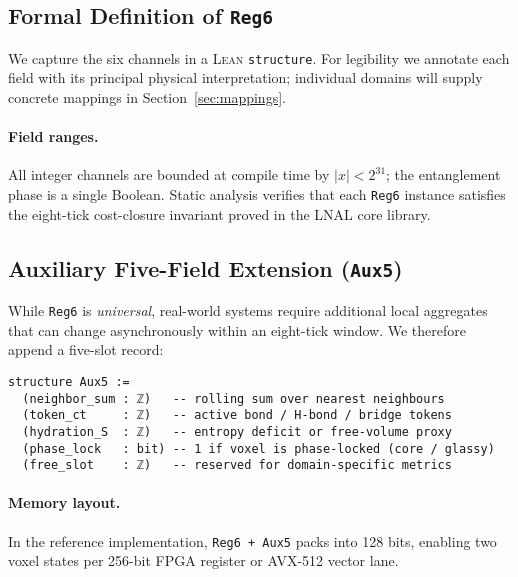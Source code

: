 \documentclass[11pt,a4paper]{article}
\begin{document}
\subsection{Formal Definition of \texttt{Reg6}}
\label{subsec:reg6-definition}

\noindent
We capture the six channels in a \textsc{Lean} \texttt{structure}.
For legibility we annotate each field with its principal physical
interpretation; individual domains will supply concrete mappings in
Section~\ref{sec:mappings}.



\paragraph{Field ranges.}
All integer channels are bounded at compile time by
\mbox{$|x| < 2^{31}$}; the entanglement phase is a single Boolean.
Static analysis verifies that each \texttt{Reg6} instance satisfies the
eight-tick cost-closure invariant proved in the LNAL core library.

\subsection{Auxiliary Five-Field Extension (\texttt{Aux5})}
\label{subsec:aux5-extension}

\noindent
While \texttt{Reg6} is \emph{universal}, real-world systems require
additional local aggregates that can change asynchronously within an
eight-tick window.  We therefore append a five-slot record:

\begin{verbatim}
structure Aux5 :=
  (neighbor_sum : ℤ)   -- rolling sum over nearest neighbours
  (token_ct     : ℤ)   -- active bond / H-bond / bridge tokens
  (hydration_S  : ℤ)   -- entropy deficit or free-volume proxy
  (phase_lock   : bit) -- 1 if voxel is phase-locked (core / glassy)
  (free_slot    : ℤ)   -- reserved for domain-specific metrics
\end{verbatim}

\paragraph{Memory layout.}
In the reference implementation, \texttt{Reg6 + Aux5} packs into
128 bits, enabling two voxel states per 256-bit FPGA register or AVX-512
vector lane.
\end{document}
